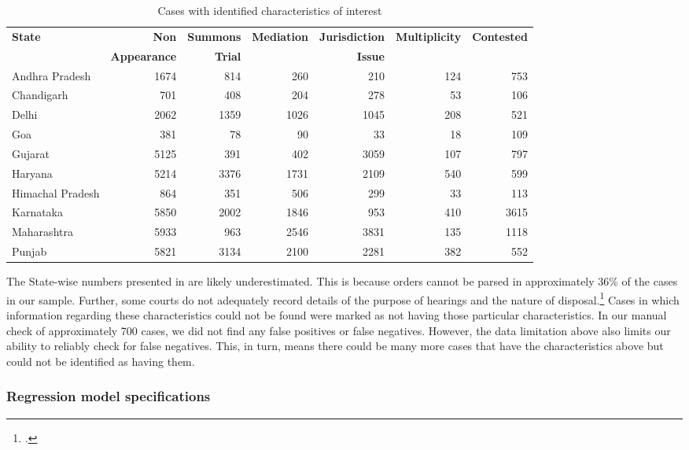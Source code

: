 {\footnotesize
 \begin{longtable}{@{}lrrrrrr@{}}
 \caption{Cases with identified characteristics of interest}
 \label{tab:case_chars}\\
 \toprule
 \textbf{State} & \textbf{Non} & \textbf{Summons} & \textbf{Mediation} & \textbf{Jurisdiction} & \textbf{Multiplicity} & \textbf{Contested} \\
 & \textbf{Appearance} & \textbf{Trial} & & \textbf{Issue} & &\\
 \midrule
 \endhead
 Andhra Pradesh   &               1674 &          814 &            260 &               210 &                  124 &            753 \\
 Chandigarh       &                701 &          408 &            204 &               278 &                   53 &            106 \\
 Delhi            &               2062 &         1359 &           1026 &              1045 &                  208 &            521 \\
 Goa              &                381 &           78 &             90 &                33 &                   18 &            109 \\
 Gujarat          &               5125 &          391 &            402 &              3059 &                  107 &            797 \\
 Haryana          &               5214 &         3376 &           1731 &              2109 &                  540 &            599 \\
 Himachal Pradesh &                864 &          351 &            506 &               299 &                   33 &            113 \\
 Karnataka        &               5850 &         2002 &           1846 &               953 &                  410 &           3615 \\
 Maharashtra      &               5933 &          963 &           2546 &              3831 &                  135 &           1118 \\
 Punjab           &               5821 &         3134 &           2100 &              2281 &                  382 &            552 \\
 \bottomrule
\end{longtable}
}

The State-wise numbers presented in  are likely underestimated. This is because orders cannot be parsed in approximately 36\% of the cases in our sample. Further, some courts do not adequately record details of the purpose of hearings and the nature of disposal.\footcite{damle2020_ecourtsData} Cases in which information regarding these characteristics could not be found were marked as not having those particular characteristics. In our manual check of approximately 700 cases, we did not find any false positives or false negatives. However, the data limitation above also limits our ability to reliably check for false negatives. This, in turn, means there could be many more cases that have the characteristics above but could not be identified as having them.



\subsubsection{Regression model specifications} \label{sec:model-selection}


